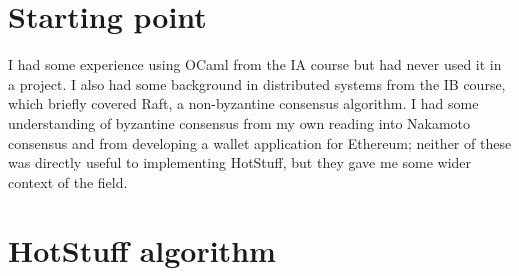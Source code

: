 




\section{Starting point}
I had some experience using OCaml from the IA course but had never used it in a project. I also had some background in distributed systems from the IB course, which briefly covered Raft, a non-byzantine consensus algorithm. I had some understanding of byzantine consensus from my own reading into Nakamoto consensus and from developing a wallet application for Ethereum; neither of these was directly useful to implementing HotStuff, but they gave me some wider context of the field.

\section{HotStuff algorithm}
